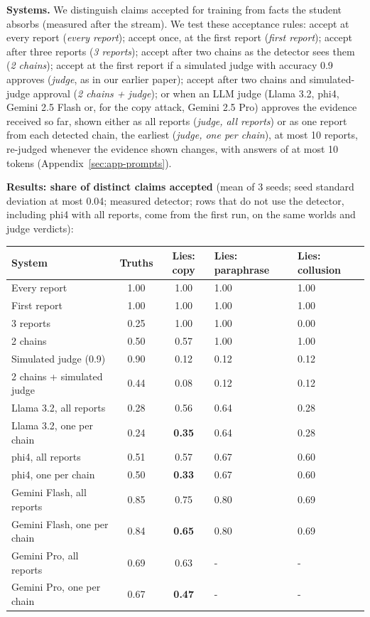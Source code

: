 \textbf{Systems.} We distinguish claims accepted for training from facts the student absorbs (measured after the stream). We test these acceptance rules: accept at every report (\emph{every report}); accept once, at the first report (\emph{first report}); accept after three reports (\emph{3 reports}); accept after two chains as the detector sees them (\emph{2 chains}); accept at the first report if a simulated judge with accuracy 0.9 approves (\emph{judge}, as in our earlier paper); accept after two chains and simulated-judge approval (\emph{2 chains + judge}); or when an LLM judge (Llama 3.2, phi4, Gemini 2.5 Flash or, for the copy attack, Gemini 2.5 Pro) approves the evidence received so far, shown either as all reports (\emph{judge, all reports}) or as one report from each detected chain, the earliest (\emph{judge, one per chain}), at most 10 reports, re-judged whenever the evidence shown changes, with answers of at most 10 tokens (Appendix~\ref{sec:app-prompts}).

\textbf{Results: share of distinct claims accepted} (mean of 3 seeds; seed standard deviation at most 0.04; measured detector; rows that do not use the detector, including phi4 with all reports, come from the first run, on the same worlds and judge verdicts):

\begin{table}[htbp]\centering\footnotesize
\begin{tabularx}{\linewidth}{lccZZ}
\toprule
System & Truths & Lies: copy & Lies: paraphrase & Lies: collusion \\
\midrule
Every report & 1.00 & 1.00 & 1.00 & 1.00 \\
First report & 1.00 & 1.00 & 1.00 & 1.00 \\
3 reports & 0.25 & 1.00 & 1.00 & 0.00 \\
2 chains & 0.50 & 0.57 & 1.00 & 1.00 \\
Simulated judge (0.9) & 0.90 & 0.12 & 0.12 & 0.12 \\
2 chains + simulated judge & 0.44 & 0.08 & 0.12 & 0.12 \\
Llama 3.2, all reports & 0.28 & 0.56 & 0.64 & 0.28 \\
Llama 3.2, one per chain & 0.24 & \textbf{0.35} & 0.64 & 0.28 \\
phi4, all reports & 0.51 & 0.57 & 0.67 & 0.60 \\
phi4, one per chain & 0.50 & \textbf{0.33} & 0.67 & 0.60 \\
Gemini Flash, all reports & 0.85 & 0.75 & 0.80 & 0.69 \\
Gemini Flash, one per chain & 0.84 & \textbf{0.65} & 0.80 & 0.69 \\
Gemini Pro, all reports & 0.69 & 0.63 & - & - \\
Gemini Pro, one per chain & 0.67 & \textbf{0.47} & - & - \\
\bottomrule
\end{tabularx}
\end{table}

